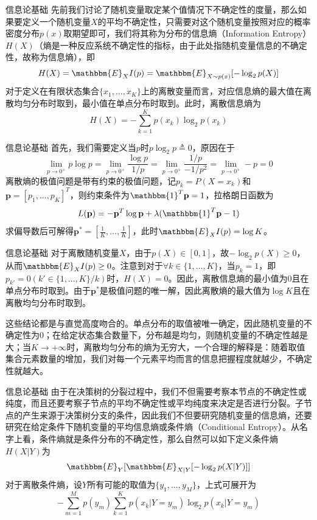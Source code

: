 \documentclass{ctexbeamer}        %
\begin{document}
\begin{frame}{信息论基础}
先前我们讨论了随机变量取定某个值情况下不确定性的度量，那么如果要定义一个随机变量$X$的平均不确定性，只需要对这个随机变量按照对应的概率密度分布$p(x)$取期望即可，我们将其称为分布的信息熵（Information Entropy）$H(X)$（熵是一种反应系统不确定性的指标，由于此处指随机变量信息的不确定性，故称为信息熵），即
$$
H(X)=\mathbbm{E}_{X}I(p)=\mathbbm{E}_{X\sim p(x)}[-\log_2 p(X)]
$$
对于定义在有限状态集合$\{x_1,...,x_K\}$上的离散变量而言，对应信息熵的最大值在离散均匀分布时取到，最小值在单点分布时取到。此时，离散信息熵为
$$
H(X)=-\sum_{k=1}^K p(x_k)\log_2p(x_k)
$$
\end{frame}

\begin{frame}{信息论基础}
首先，我们需要定义当$p$时$p\log_2p\triangleq 0$，原因在于
$$
\lim \limits_{p\to 0^+} p \log{p} = \lim \limits_{p \to 0^+} \frac{\log p}{1/p} = \lim \limits_{p \to 0^+} \frac{1/p}{-1/p^2}=\lim \limits_{p \to 0^+} -p = 0
$$
离散熵的极值问题是带有约束的极值问题，记$p_k=P(X=x_k)$和$\mathbf{p}=[p_1,...,p_K]^T$，则约束条件为$\mathbbm{1}^T\mathbf{p}=1$，拉格朗日函数为
$$
L(\mathbf{p})=-\mathbf{p}^T\log \mathbf{p} + \lambda (\mathbbm{1}^T\mathbf{p}-1)
$$
求偏导数后可解得$\mathbf{p}^*=[\frac{1}{K},...,\frac{1}{K}]$，此时$\mathbbm{E}_{X}I(p)=\log K$。
\end{frame}

\begin{frame}{信息论基础}
对于离散随机变量$X$，由于$p(X)\in [0,1]$，故$-\log_2p(X)\geq 0$，从而$\mathbbm{E}_{X}I(p)\geq 0$。注意到对于$\forall k\in \{1,...,K\}$，当$p_k=1$，即$p_{k'}=0(k'\in \{1,...,K\}/k)$时，$H(X)=0$。因此，离散信息熵的最小值为0且在单点分布时取到。由于$\mathbf{p}^*$是极值问题的唯一解，因此离散熵的最大值为$\log K$且在离散均匀分布时取到。
\newline

这些结论都是与直觉高度吻合的。单点分布的取值被唯一确定，因此随机变量的不确定性为0；在给定状态集合数量下，分布越是均匀，则随机变量的不确定性越是大；当$K\rightarrow +\infty$时，离散均匀分布的熵为无穷大，一个合理的解释是：随着取值集合元素数量的增加，我们对每一个元素平均而言的信息把握程度就越少，不确定性就越大。
\end{frame}

\begin{frame}{信息论基础}
由于在决策树的分裂过程中，我们不但需要考察本节点的不确定性或纯度，而且还要考察子节点的平均不确定性或平均纯度来决定是否进行分裂。子节点的产生来源于决策树分支的条件，因此我们不但要研究随机变量的信息熵，还要研究在给定条件下随机变量的平均信息熵或条件熵（Conditional Entropy）。从名字上看，条件熵就是条件分布的不确定性，那么自然可以如下定义条件熵$H(X\vert Y)$为
$$
\mathbbm{E}_{Y}[\mathbbm{E}_{X\vert Y}[-\log_2p(X\vert Y)]]
$$
对于离散条件熵，设$Y$所有可能的取值为$\{y_1,...,y_M\}$，上式可展开为
$$
-\sum_{m=1}^Mp(y_m)\sum_{k=1}^K p(x_k\vert Y=y_m)\log_2p(x_k\vert Y=y_m)
$$
\end{frame}
\end{document}
